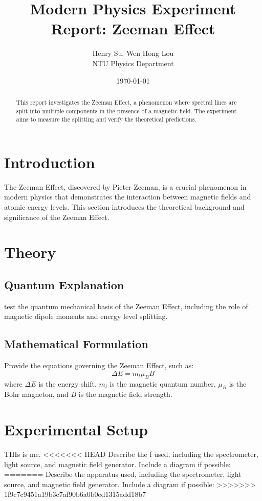 \documentclass[a4paper,12pt]{article}
\title{Modern Physics Experiment Report: Zeeman Effect}
\author{Henry Su, Wen Hong Lou\\ NTU Physics Department}
\date{\today}
\begin{document}
\maketitle

\begin{abstract}
This report investigates the Zeeman Effect, a phenomenon where spectral lines are split into multiple components in the presence of a magnetic field. The experiment aims to measure the splitting and verify the theoretical predictions. 
\end{abstract}

\tableofcontents
\newpage

\section{Introduction}
The Zeeman Effect, discovered by Pieter Zeeman, is a crucial phenomenon in modern physics that demonstrates the interaction between magnetic fields and atomic energy levels. This section introduces the theoretical background and significance of the Zeeman Effect.

\section{Theory}
\subsection{Quantum Explanation}
test  the quantum mechanical basis of the Zeeman Effect, including the role of magnetic dipole moments and energy level splitting.

\subsection{Mathematical Formulation}
Provide the equations governing the Zeeman Effect, such as:
\[
\Delta E = m_l \mu_B B
\]
where \( \Delta E \) is the energy shift, \( m_l \) is the magnetic quantum number, \( \mu_B \) is the Bohr magneton, and \( B \) is the magnetic field strength.

\section{Experimental Setup}
THIs is me.
<<<<<<< HEAD
Describe the f used, including the spectrometer, light source, and magnetic field generator. Include a diagram if possible:
=======
Describe the apparatus used, including the spectrometer, light source, and magnetic field generator. Include a diagram if possible:
>>>>>>> 1f9c7c9451a19b3c7af90b6a0b0ed1315add18b7
\end{document}
